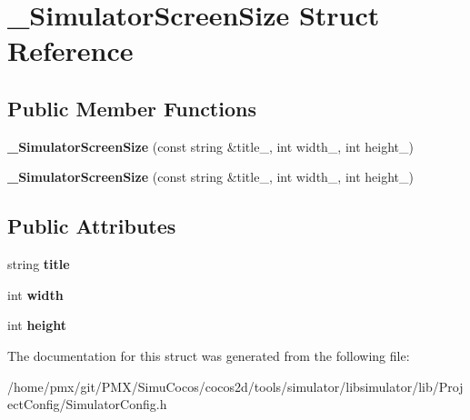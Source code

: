 \hypertarget{struct__SimulatorScreenSize}{}\section{\+\_\+\+Simulator\+Screen\+Size Struct Reference}
\label{struct__SimulatorScreenSize}
\subsection*{Public Member Functions}
\begin{DoxyCompactItemize}
\item 
\mbox{\label{struct__SimulatorScreenSize_a08f115276e6dc2cc5f606b95beee7500}} 
{\bfseries \+\_\+\+Simulator\+Screen\+Size} (const string \&title\+\_\+, int width\+\_\+, int height\+\_\+)
\item 
\mbox{\label{struct__SimulatorScreenSize_a08f115276e6dc2cc5f606b95beee7500}} 
{\bfseries \+\_\+\+Simulator\+Screen\+Size} (const string \&title\+\_\+, int width\+\_\+, int height\+\_\+)
\end{DoxyCompactItemize}
\subsection*{Public Attributes}
\begin{DoxyCompactItemize}
\item 
\mbox{\label{struct__SimulatorScreenSize_a75219cf69ba6421d54823c008cbf14bc}} 
string {\bfseries title}
\item 
\mbox{\label{struct__SimulatorScreenSize_ac0b755435ee5b2a314c673994bede40b}} 
int {\bfseries width}
\item 
\mbox{\label{struct__SimulatorScreenSize_a06fe58c1c1fed5e10ff9bca367a1eb2d}} 
int {\bfseries height}
\end{DoxyCompactItemize}


The documentation for this struct was generated from the following file\+:\begin{DoxyCompactItemize}
\item 
/home/pmx/git/\+P\+M\+X/\+Simu\+Cocos/cocos2d/tools/simulator/libsimulator/lib/\+Project\+Config/Simulator\+Config.\+h\end{DoxyCompactItemize}
